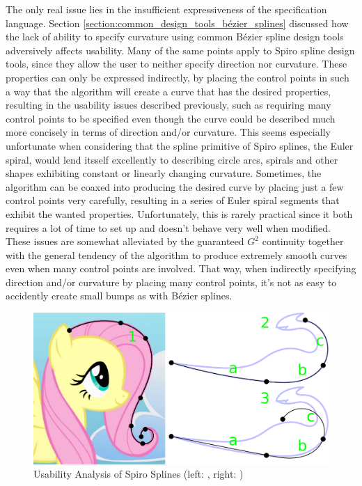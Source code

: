 \documentclass[a4paper]{article}
\begin{document}
				The only real issue lies in the insufficient expressiveness of the specification language. Section \ref{section:common_design_tools_bézier_splines} discussed how the lack of ability to specify curvature using common Bézier spline design tools adversively affects usability. Many of the same points apply to Spiro spline design tools, since they allow the user to neither specify direction nor curvature. These properties can only be expressed indirectly, by placing the control points in such a way that the algorithm will create a curve that has the desired properties, resulting in the usability issues described previously, such as requiring many control points to be specified even though the curve could be described much more concisely in terms of direction and/or curvature. This seems especially unfortunate when considering that the spline primitive of Spiro splines, the Euler spiral, would lend itsself excellently to describing circle arcs, spirals and other shapes exhibiting constant or linearly changing curvature. Sometimes, the algorithm can be coaxed into producing the desired curve by placing just a few control points very carefully, resulting in a series of Euler spiral segments that exhibit the wanted properties. Unfortunately, this is rarely practical since it both requires a lot of time to set up and doesn't behave very well when modified. These issues are somewhat alleviated by the guaranteed \(G^2\) continuity together with the general tendency of the algorithm to produce extremely smooth curves even when many control points are involved. That way, when indirectly specifying direction and/or curvature by placing many control points, it's not as easy to accidently create small bumps as with Bézier splines.

				\begin{figure}[htb]
					\centering
					\includegraphics[width=\textwidth]{../resources/usability_spiro.pdf}
					\caption{Usability Analysis of Spiro Splines (left: \cite{Fluttershy}, right: \cite{Lugia})}
					\label{figure:usability_spiro}
				\end{figure}
\end{document}
